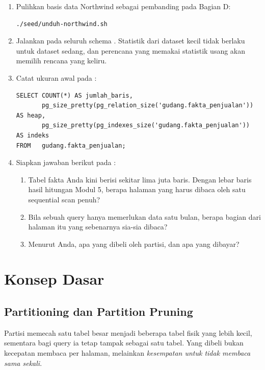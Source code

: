 \begin{enumerate}[leftmargin=1.4em]
        Bila waktu tidak mencukupi, pulihkan
         yang disediakan asisten.
  \item Pulihkan basis data Northwind sebagai pembanding pada Bagian D:
\begin{lstlisting}[style=shellgaya]
./seed/unduh-northwind.sh
\end{lstlisting}
  \item Jalankan  pada seluruh schema .
        Statistik dari dataset kecil tidak berlaku untuk dataset sedang, dan
        perencana yang memakai statistik usang akan memilih rencana yang keliru.
  \item Catat ukuran awal pada :
\begin{lstlisting}[style=sqlgaya]
SELECT COUNT(*) AS jumlah_baris,
       pg_size_pretty(pg_relation_size('gudang.fakta_penjualan')) AS heap,
       pg_size_pretty(pg_indexes_size('gudang.fakta_penjualan'))  AS indeks
FROM   gudang.fakta_penjualan;
\end{lstlisting}
  \item Siapkan jawaban berikut pada :
  \begin{enumerate}[label=\alph*.,leftmargin=1.4em]
    \item Tabel fakta Anda kini berisi sekitar lima juta baris. Dengan lebar
          baris hasil hitungan Modul 5, berapa halaman yang harus dibaca oleh
          satu sequential scan penuh?
    \item Bila sebuah query hanya memerlukan data satu bulan, berapa bagian
          dari halaman itu yang sebenarnya sia-sia dibaca?
    \item Menurut Anda, apa yang dibeli oleh partisi, dan apa yang dibayar?
  \end{enumerate}
\end{enumerate}

\section{Konsep Dasar}

\subsection{Partitioning dan Partition Pruning}

Partisi memecah satu tabel besar menjadi beberapa tabel fisik yang lebih kecil,
sementara bagi query ia tetap tampak sebagai satu tabel. Yang dibeli bukan
kecepatan membaca per halaman, melainkan \emph{kesempatan untuk tidak membaca
sama sekali}.

